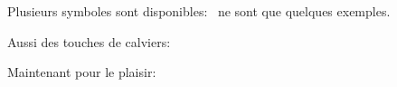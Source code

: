 \documentclass[12pt, a4paper]{article}
\begin{document}
\newgame
{}    
\showboard


Plusieurs symboles sont disponibles:
\faAndroid \faAmazon\faAreaChart \faAssistiveListeningSystems \faBank \faBellSlashO \faCab \faChrome \faCut \faFilePdfO ~ne sont que quelques exemples.

Aussi des touches de calviers:

Maintenant pour le plaisir:
\EOofficerI\EOSaw\EOPatron\EOScorpius\EORain\EOxvii \EOpi\EOki\EOSa

\blankpage

\end{document}
